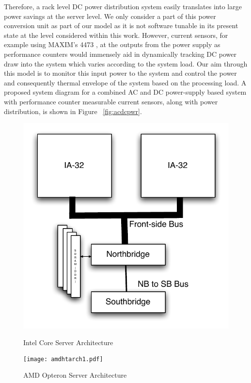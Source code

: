 \documentclass[12pt,onecolumn]{ULieeetran}
\begin{document}
Therefore, a rack level DC power distribution system easily translates
into large power savings at the server level.  We only consider a part
of this power conversion unit as part of our model as it is not software
tunable in its present state at the level considered within this
work. However, current sensors, for example using MAXIM's 4473
\cite{maxim2006}, at the outputs from the power supply as performance
counters would immensely aid in dynamically tracking DC power draw into
the system which varies according to the system load.  Our aim through
this model is to monitor this input power to the system and control the
power and consequently thermal envelope of the system based on the
processing load. A proposed system diagram for a combined AC and DC
power-supply based system with performance counter measurable current
sensors, along with power distribution, is shown in Figure
~\ref{fig:acdcpwr}.
\begin{figure}[bpth]
   \hspace{0.5cm}
  \begin{minipage}[b]{0.5\linewidth}
     \centering
     \includegraphics[scale=0.50]{intelarch.pdf}
     \caption{Intel Core Server Architecture}
     \label{fig:intarch}
   \end{minipage}
   \begin{minipage}[b]{0.5\linewidth}
     \centering
     \texttt{[image: amdhtarch1.pdf]}
     \caption{AMD Opteron Server Architecture}
     \label{fig:amdarch}
   \end{minipage}
\end{figure}
\end{document}

